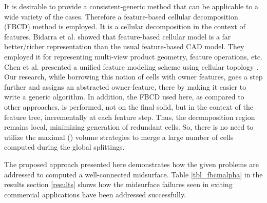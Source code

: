 It is desirable to provide a consistent-generic method that can be applicable to a wide variety of the cases. Therefore a feature-based cellular decomposition (FBCD) method is employed.  It is a cellular decomposition in the context of features. Bidarra et al. \cite{Bidarra1993, Bidarra1997, BidarraKrakerBronsvoort1998} showed that feature-based cellular model is a far better/richer representation than the usual feature-based CAD model. They employed it for representing multi-view product geometry, feature operations, etc. Chen et al. presented a unified feature modeling scheme using cellular topology \cite{Chen2006}. Our research, while borrowing this notion of cells with owner features, goes a step further and assigns an abstracted owner-feature, there by making it easier to write a generic algorithm.  In addition, the FBCD used here, as compared to other approaches, is performed, not on the final solid, but in the context of the feature tree, incrementally at each feature step. Thus, the decomposition region remains local, minimizing generation of redundant cells. So, there is no need to utilize the maximal (\cite{Woo2002}) volume strategies to merge a large number of cells computed during the global splittings. 

The proposed approach presented here demonstrates how the given problems are addressed to computed a well-connected midsurface. Table \ref{tbl_fbcmalpha} in the results section \ref{results} shows how the midsurface failures seen in exiting commercial applications have been addressed successfully.

